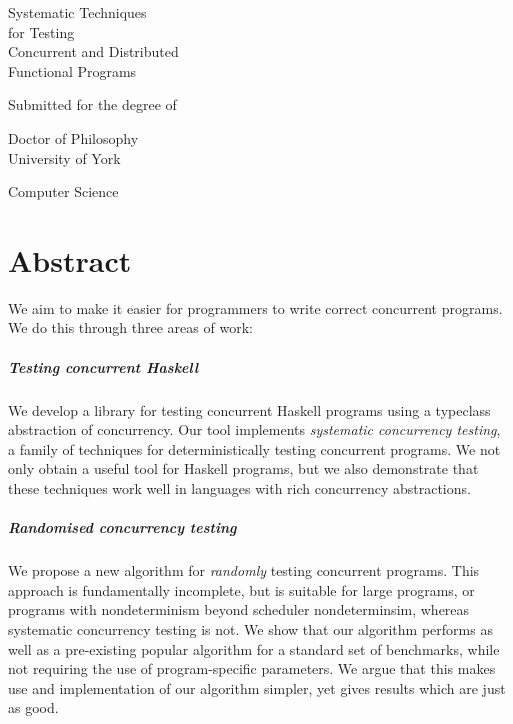 \begin{titlepage}
  \begin{center}
    \makeatletter

    {\fontsize{34pt}{36pt}\selectfont Systematic Techniques\\for Testing\\Concurrent and Distributed\\Functional Programs\par}

    \vspace{1.5cm}

    {\LARGE \@author}

    \vfill

    Submitted for the degree of\par
    Doctor of Philosophy\\[1.3cm]

    University of York\par
    Computer Science\\[1.3cm]

    \@date
    \makeatother
  \end{center}
\end{titlepage}

\chapter*{Abstract}

We aim to make it easier for programmers to write correct concurrent
programs.  We do this through three areas of work:

\paragraph{Testing concurrent Haskell}
We develop a library for testing concurrent Haskell programs using a
typeclass abstraction of concurrency.  Our tool implements
\emph{systematic concurrency testing}, a family of techniques for
deterministically testing concurrent programs.  We not only obtain a
useful tool for Haskell programs, but we also demonstrate that these
techniques work well in languages with rich concurrency abstractions.

\paragraph{Randomised concurrency testing}
We propose a new algorithm for \emph{randomly} testing concurrent
programs.  This approach is fundamentally incomplete, but is suitable
for large programs, or programs with nondeterminism beyond scheduler
nondeterminsim, whereas systematic concurrency testing is not.  We
show that our algorithm performs as well as a pre-existing popular
algorithm for a standard set of benchmarks, while not requiring the
use of program-specific parameters.  We argue that this makes use and
implementation of our algorithm simpler, yet gives results which are
just as good.

